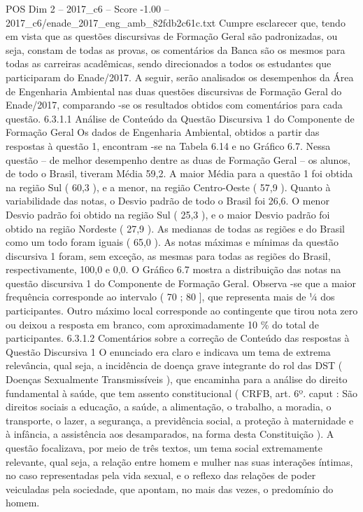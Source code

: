 \begin{textsample}{POS Dim 2 – 2017\_c6 – Score -1.00 – 2017\_c6/enade\_2017\_eng\_amb\_82fdb2c61c.txt}
Cumpre esclarecer que, tendo em vista que as questões discursivas de Formação Geral são padronizadas, ou seja, constam de todas as provas, os comentários da Banca são os mesmos para todas as carreiras acadêmicas, sendo direcionados a todos os estudantes que participaram do Enade/2017.
A seguir, serão analisados os desempenhos da Área de Engenharia Ambiental nas duas questões discursivas de Formação Geral do Enade/2017, comparando -se os resultados obtidos com comentários para cada questão. 6.3.1.1 Análise de Conteúdo da Questão Discursiva 1 do Componente de Formação Geral Os dados de Engenharia Ambiental, obtidos a partir das respostas à questão 1, encontram -se na Tabela 6.14 e no Gráfico 6.7.
Nessa questão – de melhor desempenho dentre as duas de Formação Geral – os alunos, de todo o Brasil, tiveram Média 59,2.
A maior Média para a questão 1 foi obtida na região Sul ( 60,3 ), e a menor, na região Centro-Oeste ( 57,9 ).
Quanto à variabilidade das notas, o Desvio padrão de todo o Brasil foi 26,6.
O menor Desvio padrão foi obtido na região Sul ( 25,3 ), e o maior Desvio padrão foi obtido na região Nordeste ( 27,9 ).
As medianas de todas as regiões e do Brasil como um todo foram iguais ( 65,0 ).
As notas máximas e mínimas da questão discursiva 1 foram, sem exceção, as mesmas para todas as regiões do Brasil, respectivamente, 100,0 e 0,0.
O Gráfico 6.7 mostra a distribuição das notas na questão discursiva 1 do Componente de Formação Geral.
Observa -se que a maior frequência corresponde ao intervalo ( 70 ; 80 ], que representa mais de ¼ dos participantes.
Outro máximo local corresponde ao contingente que tirou nota zero ou deixou a resposta em branco, com aproximadamente 10 \% do total de participantes. 6.3.1.2 Comentários sobre a correção de Conteúdo das respostas à Questão Discursiva 1 O enunciado era claro e indicava um tema de extrema relevância, qual seja, a incidência de doença grave integrante do rol das DST ( Doenças Sexualmente Transmissíveis ), que encaminha para a análise do direito fundamental à saúde, que tem assento constitucional ( CRFB, art. 6º. caput : São direitos sociais a educação, a saúde, a alimentação, o trabalho, a moradia, o transporte, o lazer, a segurança, a previdência social, a proteção à maternidade e à infância, a assistência aos desamparados, na forma desta Constituição ).
A questão focalizava, por meio de três textos, um tema social extremamente relevante, qual seja, a relação entre homem e mulher nas suas interações íntimas, no caso representadas pela vida sexual, e o reflexo das relações de poder veiculadas pela sociedade, que apontam, no mais das vezes, o predomínio do homem.

\end{textsample}
